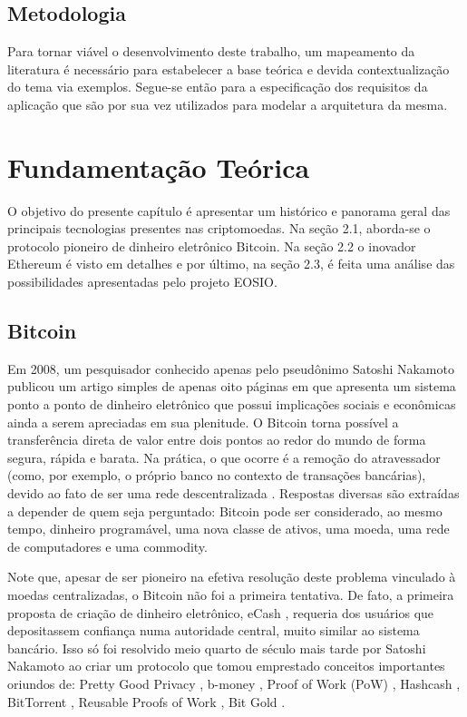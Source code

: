 \documentclass[a4paper,12pt]{monografia}
\theoremstyle{plain}
\theoremstyle{definition}
\theoremstyle{remark}
\begin{document}
\section{Metodologia}
Para tornar vi\'{a}vel o desenvolvimento deste trabalho, um mapeamento da literatura \'{e} necess\'{a}rio para estabelecer a base te\'{o}rica e devida contextualiza\c{c}\~{a}o do tema via exemplos.
Segue-se ent\~{a}o para a especifica\c{c}\~{a}o dos requisitos da aplica\c{c}\~{a}o que s\~{a}o por sua vez utilizados para modelar a arquitetura da mesma.

\chapter{Fundamenta\c{c}\~ao Te\'orica}

O objetivo do presente cap\'itulo \'e apresentar um hist\'orico e panorama geral das principais tecnologias presentes nas criptomoedas.
Na se\c{c}\~{a}o 2.1, aborda-se o protocolo pioneiro de dinheiro eletr\^{o}nico Bitcoin.
Na se\c{c}\~{a}o 2.2 o inovador Ethereum \'e visto em detalhes e por \'{u}ltimo, na se\c{c}\~{a}o 2.3, \'e feita uma an\'alise das possibilidades apresentadas pelo projeto EOSIO.

\section{Bitcoin}

Em 2008, um pesquisador conhecido apenas pelo pseud\^onimo Satoshi Nakamoto publicou um artigo simples de apenas oito p\'aginas em que apresenta um sistema ponto a ponto de dinheiro eletr\^onico que possui implica\c{c}\~oes sociais e econ\^omicas ainda a serem apreciadas em sua plenitude.
O Bitcoin torna poss\'{i}vel a transfer\^{e}ncia direta de valor entre dois pontos ao redor do mundo de forma segura, r\'{a}pida e barata.
Na pr\'{a}tica, o que ocorre \'{e} a remo\c{c}\~{a}o do atravessador (como, por exemplo, o pr\'{o}prio banco no contexto de transa\c{c}\~{o}es banc\'{a}rias), devido ao fato de ser uma rede descentralizada \cite{bitcoin}.
Respostas diversas s\~ao extra\'idas a depender de quem seja perguntado: Bitcoin pode ser considerado, ao mesmo tempo, dinheiro program\'avel, uma nova classe de ativos, uma moeda, uma rede de computadores e uma commodity.

Note que, apesar de ser pioneiro na efetiva resolu\c{c}\~{a}o deste problema vinculado \`{a} moedas centralizadas, o Bitcoin n\~{a}o foi a primeira tentativa.
De fato, a primeira proposta de cria\c{c}\~ao de dinheiro eletr\^{o}nico, eCash \cite{ecash}, requeria dos usu\'arios que depositassem confian\c{c}a numa autoridade central, muito similar ao sistema banc\'ario.
Isso s\'o foi resolvido meio quarto de s\'eculo mais tarde por Satoshi Nakamoto ao criar um protocolo que tomou emprestado conceitos importantes oriundos de: Pretty Good Privacy \cite{pgp}, b-money \cite{b-money}, Proof of Work (PoW) \cite{pow}, Hashcash \cite{hashcash}, BitTorrent \cite{bittorrent}, Reusable Proofs of Work \cite{rpow}, Bit Gold \cite{bitgold}.
\end{document}
